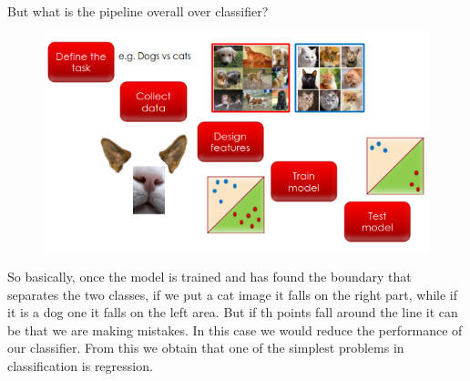 But what is the pipeline overall over classifier?
\begin{figure}[h]
    \centering
    \includegraphics[scale=0.6]{Figures/PipelineClassifier.png}
\end{figure}
So basically, once the model is trained and has found the boundary that separates the two classes, if we put a cat image it falls on the right part, while if it is a dog one it falls on the left area. But if th points fall around the line it can be that we are making mistakes.
In this case we would reduce the performance of our classifier. From this we obtain that one of the simplest problems in classification is regression.
